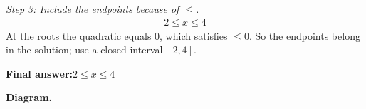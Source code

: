 \documentclass[11pt]{article}
\begin{document}
\textit{Step 3: Include the endpoints because of \( \leq \).}
\[\begin{gathered}
2 \leq x \leq 4
\end{gathered}\]
At the roots the quadratic equals 0, which satisfies \( \leq 0 \). So the endpoints belong in the solution; use a closed interval \( [2, 4] \).

\begin{answerbox}
\textbf{Final answer:}\quad \(\displaystyle 2 \leq x \leq 4\)
\end{answerbox}
\textbf{Diagram.}

\begin{center}
\end{center}
\end{document}
